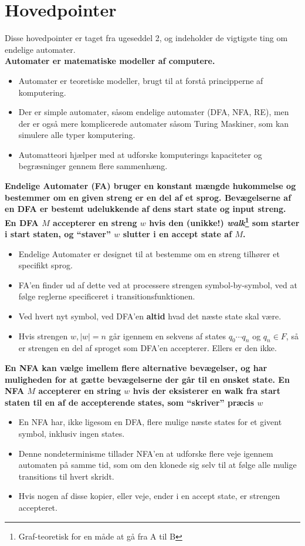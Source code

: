 \newpage
\section{Hovedpointer}%
\label{sec:hovedpointer}

Disse hovedpointer er taget fra ugeseddel 2, og indeholder de vigtigste ting om endelige automater.\\
\noindent
\textbf{Automater er matematiske modeller af computere.}
\begin{itemize}
  \item Automater er teoretiske modeller, brugt til at forstå principperne af komputering.
  \item Der er simple automater, såsom endelige automater (DFA, NFA, RE), men der er også mere komplicerede automater såsom Turing Maskiner, som kan simulere alle typer komputering.
  \item Automatteori hjælper med at udforske komputerings kapaciteter og begræsninger gennem flere sammenhæng.
\end{itemize}
\noindent
\textbf{Endelige Automater (FA) bruger en konstant mængde hukommelse og bestemmer om en given streng er en del af et sprog. Bevægelserne af en DFA er bestemt udelukkende af dens start state og input streng. En DFA $M$ accepterer en streng $w$ hvis den (unikke!) \textit{walk}\footnote{Graf-teoretisk for en måde at gå fra A til B} som starter i start staten, og ``staver'' $w$ slutter i en accept state af $M$.}
\begin{itemize}
  \item Endelige Automater er designet til at bestemme om en streng tilhører et specifikt sprog.
  \item FA'en finder ud af dette ved at processere strengen symbol-by-symbol, ved at følge reglerne specificeret i transitionsfunktionen.
  \item Ved hvert nyt symbol, ved DFA'en \textbf{altid} hvad det næste state skal være.
  \item Hvis strengen $w, |w| = n$ går igennem en sekvens af states $q_{0} \cdots q_{n}$ og $q_{n} \in F$, så er strengen en del af sproget som DFA'en accepterer. Ellers er den ikke.
\end{itemize}
\noindent
\textbf{En NFA kan vælge imellem flere alternative bevægelser, og har muligheden for at gætte bevægelserne der går til en ønsket state. En NFA $M$ accepterer en string $w$ hvis der eksisterer en walk fra start staten til en af de accepterende states, som ``skriver'' præcis $w$}
\begin{itemize}
  \item En NFA har, ikke ligesom en DFA, flere mulige næste states for et givent symbol, inklusiv ingen states.
  \item Denne nondeterminisme tillader NFA'en at udforske flere veje igennem automaten på samme tid, som om den klonede sig selv til at følge alle mulige transitions til hvert skridt.
  \item Hvis nogen af disse kopier, eller veje, ender i en accept state, er strengen accepteret.
\end{itemize}
